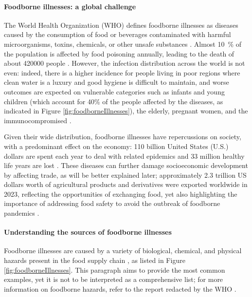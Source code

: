 \paragraph{Foodborne illnesses: a global challenge}
The World Health Organization (WHO) defines foodborne illnesses as diseases caused by the consumption of food or beverages contaminated with harmful microorganisms, toxins, chemicals, or other unsafe substances \citep{whoFoodborne2025}. Almost \SI{10}{\percent} of the population is affected by food poisoning annually, leading to the death of about \num{420000} people \citep{whoBurden2015}. However, the infection distribution across the world is not even: indeed, there is a higher incidence for people living in poor regions where clean water is a luxury and good hygiene is difficult to maintain, and worse outcomes are expected on vulnerable categories such as infants and young children (which account for 40\% of the people affected by the diseases, as indicated in Figure \ref{fig:foodborneIllnesses}), the elderly, pregnant women, and the immunocompromised \citep{whoBurden2015}.  

Given their wide distribution, foodborne illnesses have repercussions on society, with a predominant effect on the economy: 110 billion United States (U.S.) dollars are spent each year to deal with related epidemics and 33 million healthy life years are lost \citep{whoBurden2015}. These diseases can further damage socioeconomic development by affecting trade, as will be better explained later; approximately 2.3 trillion US dollars worth of agricultural products and derivatives were exported worldwide in 2023, reflecting the opportunities of exchanging food, yet also highlighting the importance of addressing food safety to avoid the outbreak of foodborne pandemics \citep{wtoInternational2023}.

\paragraph{Understanding the sources of foodborne illnesses}
Foodborne illnesses are caused by a variety of biological, chemical, and physical hazards present in the food supply chain \citep{marvinEarly2009}, as listed in Figure \ref{fig:foodborneIllnesses}. This paragraph aims to provide the most common examples, yet it is not to be interpreted as a comprehensive list; for more information on foodborne hazards, refer to the report redacted by the WHO \citep{whoBurden2015}.

